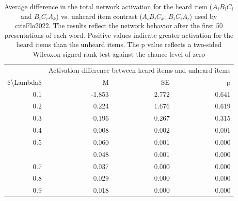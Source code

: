 \documentclass[
]{article}
\begin{document}
\begin{table}

\caption{\label{tab:basic-experiment-global-print-difference-between-3syll-items-from-flo2022}Average difference in the total network activation for the heard item ($A_iB_iC_i$ and $B_iC_iA_k$) vs. unheard item contrast ($A_iB_iC_k$; $B_iC_iA_i$) used by cite{Flo2022}. The results reflect the network behavior after the first 50 presentations of each word. Positive values indicate greater activation for the heard items than the unheard items. The p value reflects a two-sided Wilcoxon signed rank test against the chance level of zero}
\centering
\begin{tabular}[t]{rrrr}
\toprule
\multicolumn{1}{c}{ } & \multicolumn{3}{c}{Activation difference between heard items and unheard items} \\
\cmidrule(l{3pt}r{3pt}){2-4}
\$\textbackslash{}Lambda\$ & M & SE & p\\
\midrule
0.1 & -1.853 & 2.772 & 0.641\\
0.2 & 0.224 & 1.676 & 0.619\\
0.3 & -0.196 & 0.267 & 0.315\\
0.4 & 0.008 & 0.002 & 0.001\\
0.5 & 0.060 & 0.001 & 0.000\\
\addlinespace
0.6 & 0.048 & 0.001 & 0.000\\
0.7 & 0.037 & 0.000 & 0.000\\
0.8 & 0.029 & 0.000 & 0.000\\
0.9 & 0.018 & 0.000 & 0.000\\
\bottomrule
\end{tabular}
\end{table}

  
\end{document}
